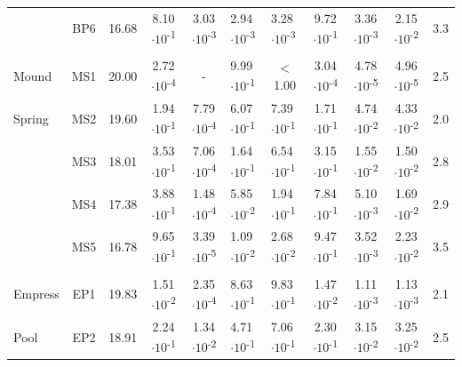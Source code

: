 \begin{landscape}
\begin{table}
\begin{adjustbox}{width=600pt,keepaspectratio}
\begin{threeparttable}
\begin{tabular}{lccccllcccc}
      & BP6   & 16.68 & 8.10$\cdot 10$\textsuperscript{-1} & 3.03$\cdot 10$\textsuperscript{-3} & 2.94$\cdot 10$\textsuperscript{-3} & 3.28$\cdot 10$\textsuperscript{-3} & 9.72$\cdot 10$\textsuperscript{-1} & 3.36$\cdot 10$\textsuperscript{-3} & 2.15$\cdot 10$\textsuperscript{-2} & 3.3 \\
      &       &       &       &       &       &       &       &       &       &  \\
Mound & MS1   & 20.00 & 2.72$\cdot 10$\textsuperscript{-4} & -     & 9.99$\cdot 10$\textsuperscript{-1} & \multicolumn{1}{c}{$<$ 1.00} & 3.04$\cdot 10$\textsuperscript{-4} & 4.78$\cdot 10$\textsuperscript{-5} & 4.96$\cdot 10$\textsuperscript{-5} & 2.5 \\
Spring & MS2   & 19.60 & 1.94$\cdot 10$\textsuperscript{-1} & 7.79$\cdot 10$\textsuperscript{-4} & 6.07$\cdot 10$\textsuperscript{-1} & 7.39$\cdot 10$\textsuperscript{-1} & 1.71$\cdot 10$\textsuperscript{-1} & 4.74$\cdot 10$\textsuperscript{-2} & 4.33$\cdot 10$\textsuperscript{-2} & 2.0 \\
      & MS3   & 18.01 & 3.53$\cdot 10$\textsuperscript{-1} & 7.06$\cdot 10$\textsuperscript{-4} & 1.64$\cdot 10$\textsuperscript{-1} & 6.54$\cdot 10$\textsuperscript{-1} & 3.15$\cdot 10$\textsuperscript{-1} & 1.55$\cdot 10$\textsuperscript{-2} & 1.50$\cdot 10$\textsuperscript{-2} & 2.8 \\
      & MS4   & 17.38 & 3.88$\cdot 10$\textsuperscript{-1} & 1.48$\cdot 10$\textsuperscript{-4} & 5.85$\cdot 10$\textsuperscript{-2} & 1.94$\cdot 10$\textsuperscript{-1} & 7.84$\cdot 10$\textsuperscript{-1} & 5.10$\cdot 10$\textsuperscript{-3} & 1.69$\cdot 10$\textsuperscript{-2} & 2.9 \\
      & MS5   & 16.78 & 9.65$\cdot 10$\textsuperscript{-1} & 3.39$\cdot 10$\textsuperscript{-5} & 1.09$\cdot 10$\textsuperscript{-2} & 2.68$\cdot 10$\textsuperscript{-2} & 9.47$\cdot 10$\textsuperscript{-1} & 3.52$\cdot 10$\textsuperscript{-3} & 2.23$\cdot 10$\textsuperscript{-2} & 3.5 \\
      &       &       &       &       &       &       &       &       &       &  \\
Empress & EP1   & 19.83 & 1.51$\cdot 10$\textsuperscript{-2} & 2.35$\cdot 10$\textsuperscript{-4} & 8.63$\cdot 10$\textsuperscript{-1} & 9.83$\cdot 10$\textsuperscript{-1} & 1.47$\cdot 10$\textsuperscript{-2} & 1.11$\cdot 10$\textsuperscript{-3} & 1.13$\cdot 10$\textsuperscript{-3} & 2.1 \\
Pool  & EP2   & 18.91 & 2.24$\cdot 10$\textsuperscript{-1} & 1.34$\cdot 10$\textsuperscript{-2} & 4.71$\cdot 10$\textsuperscript{-1} & 7.06$\cdot 10$\textsuperscript{-1} & 2.30$\cdot 10$\textsuperscript{-1} & 3.15$\cdot 10$\textsuperscript{-2} & 3.25$\cdot 10$\textsuperscript{-2} & 2.5 \\

\end{tabular}
\end{threeparttable}
\end{adjustbox}
\end{table}
\end{landscape}
